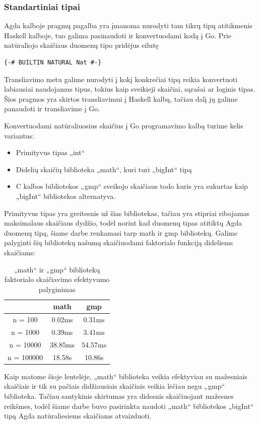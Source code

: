 \documentclass{VUMIFPSkursinis}
\begin{document}
\subsubsection{Standartiniai tipai}
Agda kalboje pragmų pagalba yra įmanoma nurodyti tam tikrų tipų atitikmenis Haskell kalboje, tuo galima pasinaudoti ir konvertuodami kodą į Go. Prie natūraliojo skaičiaus duomenų tipo pridėjus eilutę 
\begin{lstlisting}
{-# BUILTIN NATURAL Nat #-}
\end{lstlisting}
Transliavimo metu galime nurodyti į kokį konkrečiai tipą reikia konvertuoti labiausiai naudojamus tipus, tokius kaip sveikieji skaičiai, sąrašai ar loginis tipas. Šios pragmos yra skirtos transliavimui į Haskell kalbą, tačiau dalį jų galime panaudoti ir transliavime į Go. \par Konvertuodami natūraliuosius skaičius į Go programavimo kalbą turime kelis variantus:
\begin{itemize}
	\item Primityvus tipas „int“
	\item Didelių skaičių biblioteka „math“, kuri turi „bigInt“ tipą
	\item C kalbos bibliotekos „gmp“ sveikojo skaičiaus todo kuris yra sukurtas kaip  „bigInt“ bibliotekos alternatyva.
\end{itemize}
Primityvus tipas yra greitesnis už šias bibliotekas, tačiau yra stipriai ribojamas maksimalaus skaičiaus dydžio, todėl norint kad duomenų tipas atitiktų Agda duomenų tipą, šiame darbe renkamasi tarp math ir gmp bibliotekų. Galime palyginti šių bibliotekų našumą skaičiuodami faktorialo funkciją dideliems skaičiams:
\begin{center}
	\centering
	\begin{table}[H]
		\caption{„math“ ir „gmp“ bibliotekų faktorialo skaičiavimo efektyvumo palyginimas}
		\centering
	\begin{tabular}{ ccc } 
	\toprule
	& \textbf{math} & \textbf{gmp}  \\
	\midrule
	n = 100 & 0.02ms & 0.31ms    \\
	\midrule
	n = 1000 & 0.39ms & 3.41ms  \\
	\midrule
	n = 10000 & 38.85ms & 54.57ms  \\
	\midrule
	n = 100000 & 18.58s & 10.86s  \\
	\bottomrule
	\end{tabular}
	\centering
\end{table}
	\end{center}
	Kaip matome šioje lentelėje, „math“ biblioteka veikia efektyviau su mažesniais skaičiais ir tik su pačiais didžiausiais skaičiais veikia lėčiau negu „gmp“ biblioteka. Tačiau santykinis skirtumas yra didesnis skaičiuojant mažesnes reikšmes, todėl šiame darbe buvo pasirinkta naudoti „math“ bibliotekos „bigInt“ tipą Agda natūraliesiems skaičiams atvaizduoti.
\end{document}
